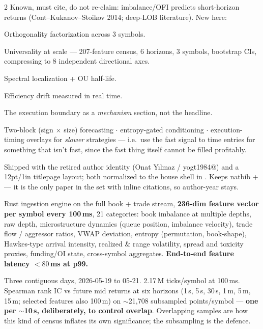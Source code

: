 \documentclass[10pt,a4paper]{article}
\begin{document}
\begin{multicols}{2}
Known, must cite, do not re-claim: imbalance/OFI predicts short-horizon returns (Cont--Kukanov--Stoikov
2014; deep-LOB literature). New here:
\begin{opnums}
\item Orthogonality factorization across 3 symbols.
\item Universality at scale — 207-feature census, 6 horizons, 3 symbols, bootstrap CIs, compressing to
      8 independent directional axes.
\item Spectral localization + OU half-life.
\item Efficiency drift measured in real time.
\item The execution boundary as a \emph{mechanism} section, not the headline.
\end{opnums}


Two-block (sign $\times$ size) forecasting $\cdot$ entropy-gated conditioning $\cdot$ execution-timing
overlays for \emph{slower} strategies — i.e.\ use the fast signal to time entries for something that
isn't fast, since the fast thing itself cannot be filled profitably.

Shipped with the retired author identity (Onat Yılmaz / yogt1984@) and a 12pt/1in titlepage layout; both
normalized to the house shell in . Keeps natbib +  — it is the only
paper in the set with inline citations, so author-year stays.

Rust ingestion engine on the full book + trade stream, \textbf{236-dim feature vector per symbol every
100\,ms}, 21 categories: book imbalance at multiple depths, raw depth, microstructure dynamics (queue
position, imbalance velocity), trade flow / aggressor ratios, VWAP deviation, entropy (permutation,
book-shape), Hawkes-type arrival intensity, realized \& range volatility, spread and toxicity proxies,
funding/OI state, cross-symbol aggregates. \textbf{End-to-end feature latency $<80$\,ms at p99.}

Three contiguous days, 2026-05-19 to 05-21. 2.17\,M ticks/symbol at 100\,ms. Spearman rank IC vs future
mid returns at six horizons (1\,s, 5\,s, 30\,s, 1\,m, 5\,m, 15\,m; selected features also 100\,m) on
$\sim$21,708 subsampled points/symbol — \textbf{one per $\sim$10\,s, deliberately, to control overlap}.
Overlapping samples are how this kind of census inflates its own significance; the subsampling is the
defence.


\end{multicols}
\end{document}
